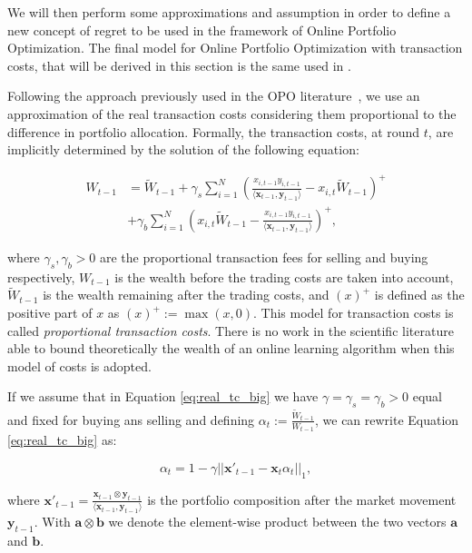 We will then perform some approximations and assumption in order to define a new concept of regret to be used in the framework of Online Portfolio Optimization. The final model for Online Portfolio Optimization with transaction costs, that will be derived in this section is the same used in \cite{das2013online}.

Following the approach previously used in the OPO literature~\cite{blum1999universal}, we use an approximation of the real transaction costs considering them proportional to the difference in portfolio allocation.
Formally, the transaction costs, at round $t$, are implicitly determined by the solution of the following equation:

\begin{align}\label{eq:real_tc_big}
W_{t-1}&=\tilde W_{t-1}+\gamma_s\sum\limits_{i=1}^N\left(\frac{x_{i,t-1}y_{i,t-1}}{\langle \mathbf x_{t-1},\mathbf y_{t-1}\rangle}-x_{i,t}\tilde W_{t-1}\right)^+\\\nonumber
&+\gamma_b\sum\limits_{i=1}^N\left(x_{i,t}\tilde W_{t-1}-\frac{x_{i,t-1}y_{i,t-1}}{\langle \mathbf x_{t-1},\mathbf y_{t-1}\rangle}\right)^+,
\end{align}

where $\gamma_s,\gamma_b>0$ are the proportional transaction fees for selling and buying respectively, $W_{t-1}$ is the wealth before the trading costs are taken into account, $\tilde W_{t-1}$ is the wealth remaining after the trading costs, and $(x)^+$ is defined as the positive part of $x$ as $(x)^+:=\max(x,0)$.
This model for transaction costs is called \emph{proportional transaction costs}. There is no work in the scientific literature able to bound theoretically the wealth of an online learning algorithm when this model of costs is adopted.

If we assume that in Equation \eqref{eq:real_tc_big} we have $\gamma=\gamma_s=\gamma_b>0$ equal and fixed for buying ans selling and defining $\alpha_t:=\frac{\tilde W_{t-1}}{W_{t-1}}$, we can rewrite Equation \eqref{eq:real_tc_big} as:

\begin{equation}\label{eq:real_tc}
   \alpha_t = 1 - \gamma ||\mathbf{x}'_{t-1}-\mathbf{x}_t \alpha_{t} ||_1,
\end{equation}

where $\mathbf{x'}_{t-1} = \frac{\mathbf{x}_{t-1} \otimes \mathbf{y}_{t-1} }{\langle \mathbf{x}_{t-1}, \mathbf{y}_{t-1} \rangle }$ is the portfolio composition after the market movement $\mathbf{y}_{t-1}$.  With $ \mathbf{a} \otimes \mathbf{b}$ we denote the element-wise product between the two vectors $\mathbf{a}$ and $\mathbf{b}$.

